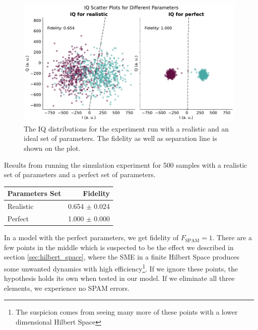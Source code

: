 \begin{figure}
    \centering
    \includegraphics[]{Simulations/budgets/figures/iq_scatter_budgetting_on_off_two.pdf}
    \caption{The IQ distributions for the experiment run with a realistic and an ideal set of parameters. The fidelity as well as separation line is shown on the plot. }
    \label{fig:realistic_perfect_comparison}
\end{figure}

\begin{margintable}[-2 cm]
    \centering
    \caption{Results from running the simulation experiment for 500 samples with a realistic set of parameters and a perfect set of parameters.}
    \begin{tabular}{l|r}
    \hline
         Parameters Set & Fidelity \\ \hline
         Realistic & 0.654 $\pm$ 0.024  \\
         Perfect   & 1.000 $\pm$ 0.000  
    \end{tabular}
    \label{tab:realistic_perfect_comparison}
\end{margintable}
In a model with the perfect parameters, we get fidelity of $F_{\text{SPAM}} = 1$. There are a few points in the middle which is suspected to be the effect we described in section \ref{sec:hilbert_space}, where  the SME in a finite Hilbert Space produces some unwanted dynamics with high efficiency\footnote{The suspicion comes from seeing many more of these points with a lower dimensional Hilbert Space}. If we ignore these points, the hypothesis holds its own when tested in our model. If we eliminate all three elements, we experience no SPAM errors.


